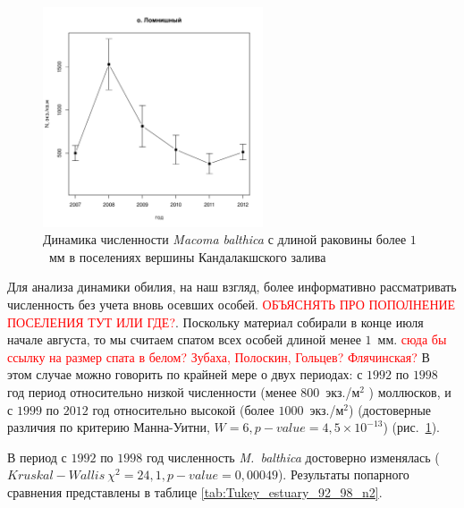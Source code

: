 \documentclass[12pt, a4paper]{disser}
\begin{document}
\begin{figure}[h]
\begin{minipage}[b]{.46\linewidth}
\begin{center}
	\end{center}
	\end{minipage}
%
	\hfil %
%
	\begin{minipage}[b]{.46\linewidth}
	\begin{center}
		\includegraphics[width=65mm]{../White_Sea/Lomnishniy/N2_dynamic.pdf}
	\end{center}
	\end{minipage}



	\caption{Динамика численности {\it Macoma balthica} с длиной раковины более $1$~мм в поселениях вершины Кандалакшского залива}
	\label{ris:dynamic_Kandalaksha_all2}
	\end{figure}



Для анализа динамики обилия, на наш взгляд, более информативно рассматривать численность без учета вновь осевших особей. 
\textcolor{red}{ОБЪЯСНЯТЬ ПРО ПОПОЛНЕНИЕ ПОСЕЛЕНИЯ ТУТ ИЛИ ГДЕ?}. 
Поскольку материал собирали в конце июля \textemdash начале августа, то мы считаем спатом всех особей длиной менее $1$~мм. \textcolor{red}{сюда бы ссылку на размер спата в белом? Зубаха, Полоскин, Гольцев? Флячинская?} 
В этом случае можно говорить по крайней мере о двух периодах: с $1992$ по $1998$ год \textemdash период относительно низкой численности (менее $800$~экз./м$^2$ ) моллюсков, и с $1999$ по $2012$ год \textemdash относительно высокой (более $1000$~экз./м$^2$) (достоверные различия по критерию Манна-Уитни, $W = 6, p-value = 4,5 \times 10^{-13}$) (рис.~\ref{ris:dynamic_Kandalaksha_all2}).

В период с $1992$ по $1998$ год численность {\it M.~balthica} достоверно изменялась ($Kruskal-Wallis\ \chi^2 = 24,1, p-value = 0,00049$). Результаты попарного сравнения представлены в таблице \ref{tab:Tukey_estuary_92_98_n2}.
\end{document}
